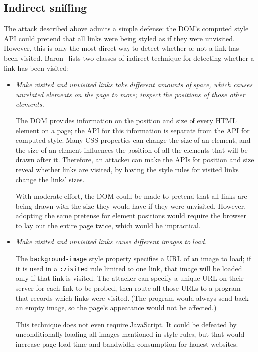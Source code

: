 \documentclass[conference]{IEEEtran}
\begin{document}
\subsection{Indirect sniffing}\label{sec:indirectsniff}

The attack described above admits a simple defense: the DOM's computed
style API could pretend that all links were being styled as if they
were unvisited.  However, this is only the most direct way to detect
whether or not a link has been visited.
Baron~\cite{moz_visited_defense} lists two classes of indirect
technique for detecting whether a link has been visited:

\begin{itemize}
\item \emph{Make visited and unvisited links take different amounts of
  space, which causes unrelated elements on the page to move; inspect
  the positions of those other elements.}

  The DOM provides information on the position and size of every HTML
  element on a page; the API for this information is separate from the
  API for computed style.  Many CSS properties can change the size of
  an element, and the size of an element influences the position of
  all the elements that will be drawn after it.  Therefore, an
  attacker can make the APIs for position and size reveal whether
  links are visited, by having the style rules for visited links
  change the links' sizes.

  With moderate effort, the DOM could be made to pretend that all
  links are being drawn with the size they would have if they were
  unvisited.  However, adopting the same pretense for element
  positions would require the browser to lay out the entire page
  twice, which would be impractical.

\item \emph{Make visited and unvisited links cause different images to load.}

  The \texttt{background-image} style property specifies a URL of an
  image to load; if it is used in a \texttt{:visited} rule limited to
  one link, that image will be loaded only if that link is visited.
  The attacker can specify a unique URL on their server for each link
  to be probed, then route all those URLs to a program that records
  which links were visited.  (The program would always send back an
  empty image, so the page's appearance would not be affected.)

  This technique does not even require JavaScript.  It could be
  defeated by unconditionally loading all images mentioned in style
  rules, but that would increase page load time and bandwidth
  consumption for honest websites.
\end{itemize}
\end{document}
